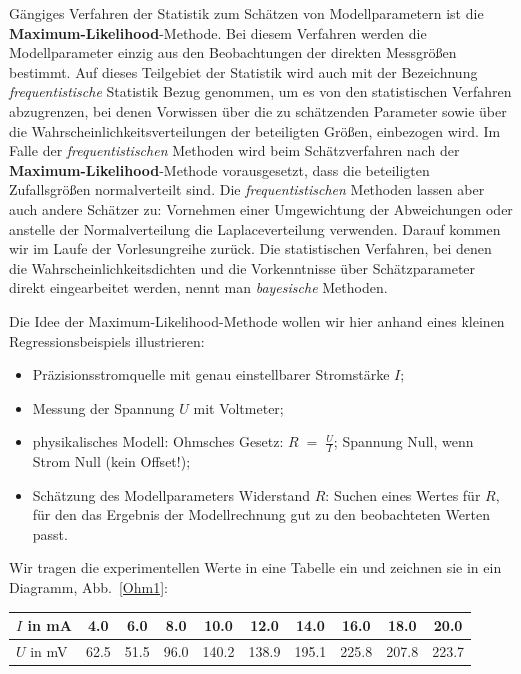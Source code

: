 Gängiges Verfahren der Statistik zum Schätzen von Modellparametern ist die \textbf{Maximum-Likelihood}-Methode.
Bei diesem Verfahren werden die Modellparameter einzig aus den Beobachtungen der direkten Messgrößen
bestimmt. Auf dieses Teilgebiet der Statistik wird auch mit der Bezeichnung \textsl{frequentistische}
Statistik Bezug genommen, um es von den statistischen Verfahren abzugrenzen, bei denen Vorwissen über
die zu schätzenden Parameter sowie über die Wahrscheinlichkeitsverteilungen der beteiligten Größen, einbezogen wird.
Im Falle der \textsl{frequentistischen} Methoden wird beim Schätzverfahren nach der \textbf{Maximum-Likelihood}-Methode
vorausgesetzt, dass die beteiligten Zufallsgrößen normalverteilt sind. Die \textsl{frequentistischen} Methoden lassen
aber auch andere Schätzer zu: Vornehmen einer Umgewichtung der Abweichungen oder anstelle der Normalverteilung die
Laplaceverteilung verwenden. Darauf kommen wir im Laufe der Vorlesungreihe zurück. Die statistischen Verfahren, bei denen
die Wahrscheinlichkeitsdichten und die Vorkenntnisse über Schätzparameter direkt eingearbeitet werden, nennt man
\textsl{bayesische} Methoden.

Die Idee der Maximum-Likelihood-Methode wollen wir hier anhand eines kleinen
Regressionsbeispiels illustrieren:
\begin{itemize}
\item Präzisionsstromquelle mit genau einstellbarer Stromstärke $I$;
\item Messung der Spannung $U$ mit Voltmeter;
\item physikalisches Modell: Ohmsches Gesetz: $R \; = \; \frac{U}{I}$; Spannung Null, wenn Strom Null (kein Offset!);
\item Schätzung des Modellparameters Widerstand $R$: Suchen eines Wertes für $R$, für den das
Ergebnis der Modellrechnung \glqq gut zu den beobachteten Werten passt\grqq.
\end{itemize}
Wir tragen die experimentellen Werte
in eine Tabelle ein und zeichnen sie in ein Diagramm, Abb.~\ref{Ohm1}:

\begin{center}
\begin{tabular}{l||c|c|c|c|c|c|c|c|c}
\hline\hline
 $I$ in mA & 4.0 &     6.0 &     8.0 &    10.0 &    12.0 &    14.0 &    16.0 &    18.0 &    20.0 \\
\hline
 $U$ in mV & 62.5 &    51.5 &    96.0 &   140.2 &   138.9 &   195.1 &   225.8 &   207.8 &   223.7 \\
\hline\hline
\end{tabular}
\end{center}

